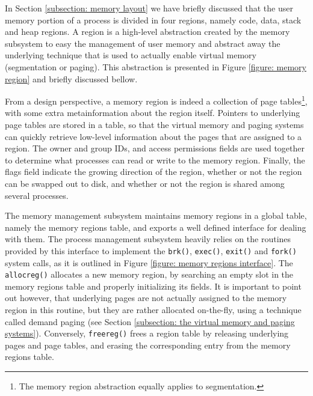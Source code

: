 	In Section \ref{subsection: memory layout} we have briefly discussed
	that the user memory portion of a process is divided in four
	regions, namely code, data, stack and heap regions. A region is a
	high-level abstraction created by the memory subsystem to easy the
	management of user memory and abstract away the underlying technique
	that is used to actually enable virtual memory (\ie segmentation or
	paging). This abstraction is presented in Figure \ref{figure: memory
	region} and briefly discussed bellow.

	From a design perspective, a memory region is indeed a collection of
	page tables\footnote{The memory region abstraction equally applies
	to segmentation.}, with some extra metainformation about the region
	itself. Pointers to underlying page tables are stored in a table, so
	that the virtual memory and paging systems can quickly retrieve
	low-level information about the pages that are assigned to a region.
	The owner and group IDs, and access permissions fields are used
	together to determine what processes can read or write to the memory
	region. Finally, the flags field indicate the growing direction of
	the region, whether or not the region can be swapped out to disk,
	and whether or not the region is shared among several processes.

	The memory management subsystem maintains memory regions in a global
	table, namely the memory regions table, and exports a well defined
	interface for dealing with them. The process management subsystem
	heavily relies on the routines provided by this interface to
	implement the \texttt{brk()}, \texttt{exec()}, \texttt{exit()} and
	\texttt{fork()} system calls, as it is outlined in Figure
	\ref{figure: memory regions interface}. The \texttt{allocreg()}
	allocates a new memory region, by searching an empty slot in the
	memory regions table and properly initializing its fields. It is
	important to point out however, that underlying pages are not
	actually assigned to the memory region in this routine, but they are
	rather allocated on-the-fly, using a technique called demand paging
	(see Section \ref{subsection: the virtual memory and paging
	systems}). Conversely, \texttt{freereg()} frees a region table by
	releasing underlying pages and page tables, and erasing the
	corresponding entry from the memory regions table.

